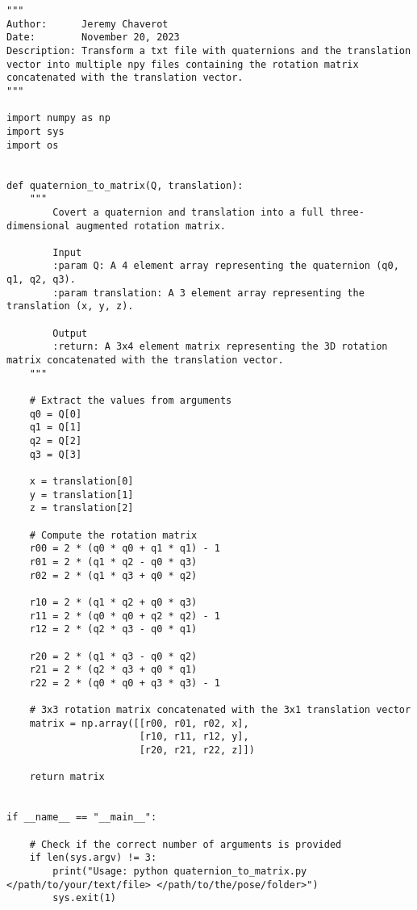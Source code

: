 \begin{lstlisting}[style=pythonstyle, label=lst:3, caption=Python script \texttt{quaternion\_to\_matrix.py} to transform a txt file with quaternions and the translation vector into multiple npy files containing the rotation matrix augmented with the translation vector.]
"""
Author:      Jeremy Chaverot
Date:        November 20, 2023
Description: Transform a txt file with quaternions and the translation vector into multiple npy files containing the rotation matrix concatenated with the translation vector.
"""

import numpy as np
import sys
import os


def quaternion_to_matrix(Q, translation):
    """
        Covert a quaternion and translation into a full three-dimensional augmented rotation matrix.

        Input
        :param Q: A 4 element array representing the quaternion (q0, q1, q2, q3).
        :param translation: A 3 element array representing the translation (x, y, z).

        Output
        :return: A 3x4 element matrix representing the 3D rotation matrix concatenated with the translation vector.
    """

    # Extract the values from arguments
    q0 = Q[0]
    q1 = Q[1]
    q2 = Q[2]
    q3 = Q[3]

    x = translation[0]
    y = translation[1]
    z = translation[2]

    # Compute the rotation matrix
    r00 = 2 * (q0 * q0 + q1 * q1) - 1
    r01 = 2 * (q1 * q2 - q0 * q3)
    r02 = 2 * (q1 * q3 + q0 * q2)

    r10 = 2 * (q1 * q2 + q0 * q3)
    r11 = 2 * (q0 * q0 + q2 * q2) - 1
    r12 = 2 * (q2 * q3 - q0 * q1)

    r20 = 2 * (q1 * q3 - q0 * q2)
    r21 = 2 * (q2 * q3 + q0 * q1)
    r22 = 2 * (q0 * q0 + q3 * q3) - 1

    # 3x3 rotation matrix concatenated with the 3x1 translation vector
    matrix = np.array([[r00, r01, r02, x],
                       [r10, r11, r12, y],
                       [r20, r21, r22, z]])

    return matrix


if __name__ == "__main__":

    # Check if the correct number of arguments is provided
    if len(sys.argv) != 3:
        print("Usage: python quaternion_to_matrix.py </path/to/your/text/file> </path/to/the/pose/folder>")
        sys.exit(1)


\end{lstlisting}
